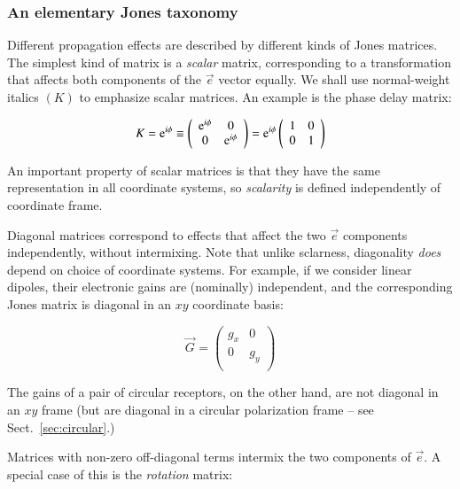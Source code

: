 \documentclass[]{aa}
\newcommand{\jones}[2]{\vec {#1}_{#2}}
\begin{document}
\subsubsection{An elementary Jones taxonomy\label{sec:taxonomy}}

Different propagation effects are described by different kinds of Jones matrices. The simplest kind of matrix is a {\em scalar} matrix, corresponding to a transformation that affects both components of the $\vec e$ vector equally. We shall use normal-weight italics $(K)$ to emphasize scalar matrices. An example is the phase delay matrix:

    \[
    K = {\rm e}^{i\phi} \equiv 
    \left( 
    \begin{array}{cc}
    {\rm e}^{i\phi} & 0 \\
    0 & {\rm e}^{i\phi} \\
    \end{array}
    \right) =   
    {\rm e}^{i\phi} \left( 
    \begin{array}{cc}
    1 & 0 \\
    0 & 1 \\
    \end{array}
    \right)    
    \]

An important property of scalar matrices is that they have the same representation in all coordinate systems, so {\em scalarity} is defined independently of coordinate frame.

Diagonal matrices correspond to effects that affect the two $\vec e$ components independently, without intermixing. Note that unlike sclarness, diagonality {\em does} depend on choice of coordinate systems. For example, if we consider linear dipoles, their electronic gains are (nominally) independent, and the corresponding Jones matrix is diagonal in an $xy$ coordinate basis:

    \[
    \jones{G}{} = 
    \left( 
    \begin{array}{cc}
    g_x & 0 \\
    0 & g_y \\
    \end{array}
    \right) 
    \]

The gains of a pair of circular receptors, on the other hand, are not diagonal in an $xy$ frame (but are diagonal in a circular polarization frame -- see Sect.~\ref{sec:circular}.)

Matrices with non-zero off-diagonal terms intermix the two components of $\vec e$. A special case of this is the {\em rotation} matrix:
\end{document}
